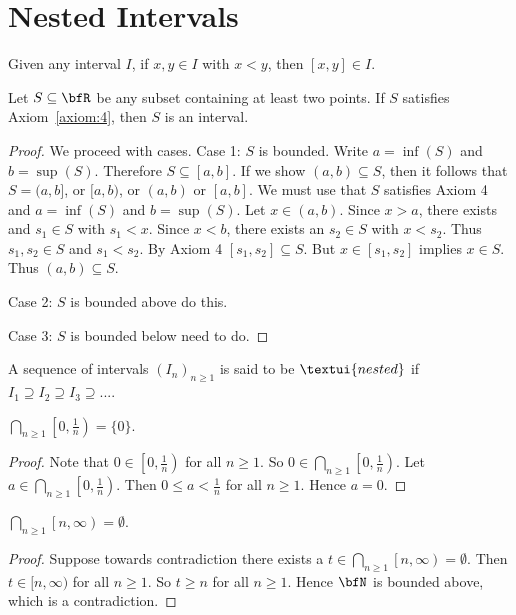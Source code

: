 \section{Nested Intervals}
    \begin{axiom}\label{axiom:4}
        Given any interval $I$, if $x,y \in I$ with $x<y$, then $[x,y] \in I$.
    \end{axiom}
    \begin{theorem}
        Let $S \subseteq \bfR$ be any subset containing at least two points. If $S$ satisfies Axiom~\ref{axiom:4}, then $S$ is an interval.
    \end{theorem}
        \begin{proof}
            We proceed with cases. Case 1: $S$ is bounded. Write $a = \inf(S)$ and $b = \sup(S)$. Therefore $S \subseteq [a,b]$. If we show $(a,b) \subseteq S$, then it follows that $S = (a,b]$, or $[a,b)$, or $(a,b)$ or $[a,b]$. We must use that $S$ satisfies Axiom 4 and $a = \inf(S)$ and $b = \sup(S)$. Let $x \in (a,b)$. Since $x > a$, there exists and $s_1 \in S$ with $s_1 < x$. Since $x < b$, there exists an $s_2 \in S$ with $x< s_2$. Thus $s_1,s_2 \in S$ and $s_1 < s_2$. By Axiom 4 $[s_1 ,s_2] \subseteq S$. But $x \in [s_1,s_2]$ implies $x \in S$. Thus $(a,b) \subseteq S$.

            Case 2: $S$ is bounded above {\color{red} do this}.

            Case 3: $S$ is bounded below {\color{red} need to do}.
        \end{proof}

    \begin{definition}
        A sequence of intervals $(I_n)_{n\geq 1}$ is said to be $\textui{nested}$ if $I_1 \supseteq I_2 \supseteq I_3 \supseteq ...$.
    \end{definition}

    \begin{proposition}
        $\bigcap_{n\geq 1}\left[0,\frac{1}{n}\right) = \{0 \}$. 
    \end{proposition}
        \begin{proof}
            Note that $0 \in \left[0,\frac{1}{n}\right)$ for all $n\geq 1$. So $0 \in \bigcap_{n\geq 1}\left[0,\frac{1}{n}\right)$. Let $a \in \bigcap_{n\geq 1}\left[0,\frac{1}{n}\right)$. Then $0 \leq a < \frac{1}{n}$ for all $n \geq 1$. Hence $a =0$.
        \end{proof}

    \begin{proposition}
        $\bigcap_{n\geq 1}\left[n,\infty\right) = \emptyset$. 
    \end{proposition}
        \begin{proof}
            Suppose towards contradiction there exists a $t \in \bigcap_{n\geq 1}\left[n,\infty\right) = \emptyset$. Then $t \in [n,\infty)$ for all $n\geq 1$. So $t \geq n$ for all $n \geq 1$. Hence $\bfN$ is bounded above, which is a contradiction.
        \end{proof}
    

